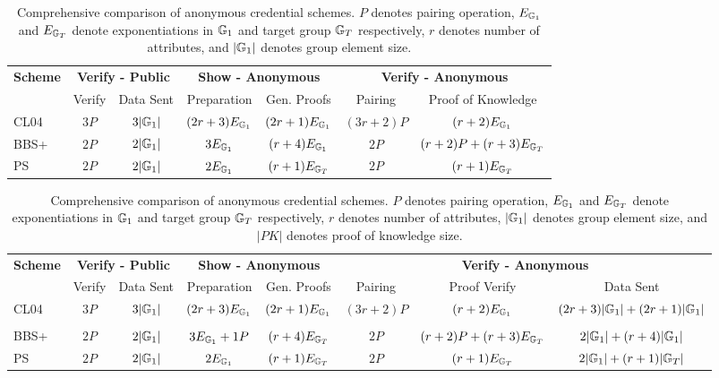 {\begin{table}[ht]
\centering
\begin{tabular}{l|cc|cc|cc}
\toprule
\multirow{2}{*}{\textbf{Scheme}} & \multicolumn{2}{c|}{\textbf{Verify - Public}} & \multicolumn{2}{c|}{\textbf{Show - Anonymous}} & \multicolumn{2}{c}{\textbf{Verify - Anonymous}} \\
& Verify & Data Sent & Preparation & Gen. Proofs & Pairing & Proof of Knowledge \\
\midrule
CL04 & $3P$ & $3|\mathbb{G}_1|$ & $(2r + 3)E_{\mathbb{G}_1}$ & $(2r + 1)E_{\mathbb{G}_1}$ & $(3r + 2)P$ & $(r + 2)E_{\mathbb{G}_1}$ \\
BBS+ & $2P$ & $2|\mathbb{G}_1|$ & $3E_{\mathbb{G}_1}$ & $(r + 4)E_{\mathbb{G}_1}$ & $2P$ & $(r + 2)P + (r + 3)E_{\mathbb{G}_T}$ \\
PS & $2P$ & $2|\mathbb{G}_1|$ & $2E_{\mathbb{G}_1}$ & $(r + 1)E_{\mathbb{G}_T}$ & $2P$ & $(r + 1)E_{\mathbb{G}_T}$ \\
\bottomrule
\end{tabular}
\caption{Comprehensive comparison of anonymous credential schemes. $P$ denotes pairing operation, $E_{\mathbb{G}_1}$ and $E_{\mathbb{G}_T}$ denote exponentiations in $\mathbb{G}_1$ and target group $\mathbb{G}_T$ respectively, $r$ denotes number of attributes, and $|\mathbb{G}_1|$ denotes group element size.}
\label{tab:unified-comparison}
\end{table}



\begin{table}[ht]
\centering
\begin{tabular}{l|cc|cc|ccc}
\toprule
\multirow{2}{*}{\textbf{Scheme}} & \multicolumn{2}{c|}{\textbf{Verify - Public}} & \multicolumn{2}{c|}{\textbf{Show - Anonymous}} & \multicolumn{3}{c}{\textbf{Verify - Anonymous}} \\
& Verify & Data Sent & Preparation & Gen. Proofs & Pairing & Proof Verify & Data Sent \\
\midrule
CL04 & $3P$ & $3|\mathbb{G}_1|$ & $(2r + 3)E_{\mathbb{G}_1}$ & $(2r + 1)E_{\mathbb{G}_1}$ & $(3r + 2)P$ & $(r + 2)E_{\mathbb{G}_1}$ & $(2r + 3)|\mathbb{G}_1| + (2r + 1)|\mathbb{G}_1|$ \\ \\
BBS+ & $2P$ & $2|\mathbb{G}_1|$ & $3E_{\mathbb{G}_1} + 1P$ & $(r + 4)E_{\mathbb{G}_T}$ & $2P$ & $(r + 2)P + (r + 3)E_{\mathbb{G}_T}$ & $2|\mathbb{G}_1| + (r + 4)|\mathbb{G}_1|$ \\
PS & $2P$ & $2|\mathbb{G}_1|$ & $2E_{\mathbb{G}_1}$ & $(r + 1)E_{\mathbb{G}_T}$ & $2P$ & $(r + 1)E_{\mathbb{G}_T}$ & $2|\mathbb{G}_1| + (r + 1)|\mathbb{G}_T|$ \\
\bottomrule
\end{tabular}
\caption{Comprehensive comparison of anonymous credential schemes. $P$ denotes pairing operation, $E_{\mathbb{G}_1}$ and $E_{\mathbb{G}_T}$ denote exponentiations in $\mathbb{G}_1$ and target group $\mathbb{G}_T$ respectively, $r$ denotes number of attributes, $|\mathbb{G}_1|$ denotes group element size, and $|PK|$ denotes proof of knowledge size.}
\label{tab:unified-comparison}
\end{table}



}
